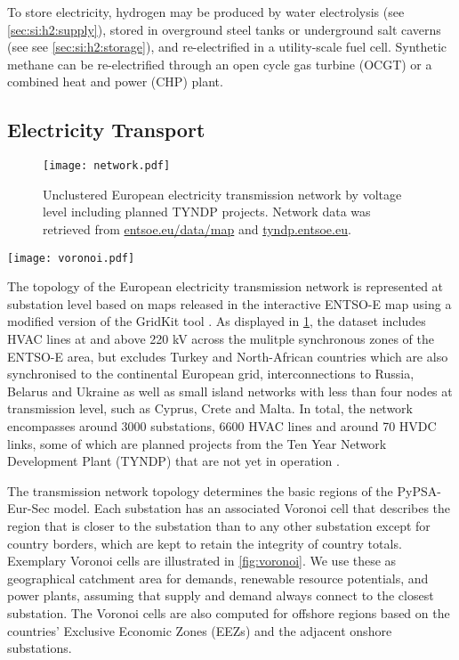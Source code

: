 To store electricity, hydrogen may be produced by water electrolysis (see
\cref{sec:si:h2:supply}), stored in overground steel tanks or underground salt
caverns (see see \cref{sec:si:h2:storage}), and re-electrified in a
utility-scale fuel cell. Synthetic methane can be re-electrified through an open
cycle gas turbine (OCGT) or a combined heat and power (CHP) plant.

\subsection{Electricity Transport}
\label{sec:si:electricity:transport}

\begin{figure}
    \texttt{[image: network.pdf]}
    \caption{Unclustered European electricity transmission network by voltage level including planned TYNDP projects. Network data was retrieved from \href{https://www.entsoe.eu/data/map/}{entsoe.eu/data/map} and \href{https://tyndp.entsoe.eu/}{tyndp.entsoe.eu}.}
    \label{fig:base-network}
\end{figure}

\begin{SCfigure}
    \caption{Exemplary Voronoi cells of the transmission network's substations.}
    \texttt{[image: voronoi.pdf]}
    \label{fig:voronoi}
\end{SCfigure}


The topology of the European electricity transmission network is represented at
substation level based on maps released in the interactive \mbox{ENTSO-E} map 
using a modified version of the GridKit tool . As displayed in
\cref{fig:base-network}, the dataset includes HVAC lines at and above 220 kV
across the mulitple synchronous zones of the \mbox{ENTSO-E} area, but excludes Turkey
and North-African countries which are also synchronised to the continental
European grid, interconnections to Russia, Belarus and Ukraine as well as small
island networks with less than four nodes at transmission level, such as Cyprus,
Crete and Malta. In total, the network encompasses around 3000 substations, 6600
HVAC lines and around 70 HVDC links, some of which are planned projects from the
Ten Year Network Development Plant (TYNDP) that are not yet in operation
.


The transmission network topology determines the basic regions of the
PyPSA-Eur-Sec model. Each substation has an associated Voronoi cell that
describes the region that is closer to the substation than to any other
substation except for country borders, which are kept to retain the integrity of
country totals. Exemplary Voronoi cells are illustrated in \cref{fig:voronoi}.
We use these as geographical catchment area for demands, renewable resource
potentials, and power plants, assuming that supply and demand always connect to
the closest substation. The Voronoi cells are also computed for offshore regions
based on the countries' Exclusive Economic Zones (EEZs) and the adjacent onshore
substations.

